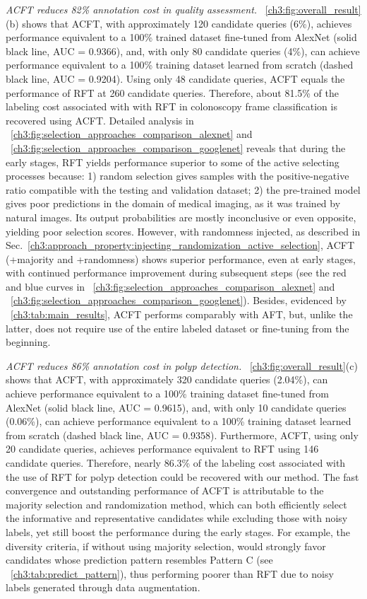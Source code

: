 \textit{ACFT reduces 82\% annotation cost in quality assessment.} \figurename~\ref{ch3:fig:overall_result}(b) shows that ACFT, with approximately 120 candidate queries (6\%), achieves performance equivalent to a 100\% trained dataset fine-tuned from AlexNet (solid black line, AUC = 0.9366), and, with only 80 candidate queries (4\%), can achieve performance equivalent to a 100\% training dataset learned from scratch (dashed black line, AUC = 0.9204). Using only 48 candidate queries, ACFT equals the performance of RFT at 260 candidate queries. Therefore, about 81.5\% of the labeling cost associated with with RFT in colonoscopy frame classification is recovered using ACFT. Detailed analysis in \figurename~\ref{ch3:fig:selection_approaches_comparison_alexnet} and \figurename~\ref{ch3:fig:selection_approaches_comparison_googlenet} reveals that during the early stages, RFT yields performance superior to some of the active selecting processes because: 
1) random selection gives samples with the positive-negative ratio compatible with the testing and validation dataset; 2) the pre-trained model gives poor predictions in the domain of medical imaging, as it was trained by natural images. Its output probabilities are mostly inconclusive or even opposite, yielding poor selection scores. However, with randomness injected, as described in Sec.~\ref{ch3:approach_property:injecting_randomization_active_selection}, ACFT (+majority and +randomness) shows superior performance, even at early stages, with continued performance improvement during subsequent steps (see the red and blue curves in \figurename~\ref{ch3:fig:selection_approaches_comparison_alexnet} and \figurename~\ref{ch3:fig:selection_approaches_comparison_googlenet}). Besides, evidenced by \tableautorefname~\ref{ch3:tab:main_results}, ACFT performs comparably with AFT, but, unlike the latter, does not require use of the entire labeled dataset or fine-tuning from the beginning. 

\textit{ACFT reduces 86\% annotation cost in polyp detection.} \figurename~\ref{ch3:fig:overall_result}(c) shows that ACFT, with approximately 320 candidate queries (2.04\%), can achieve performance equivalent to a 100\% training dataset fine-tuned from AlexNet (solid black line, AUC = 0.9615), and, with only 10 candidate queries (0.06\%), can achieve  performance equivalent to a 100\% training dataset learned from scratch (dashed black line, AUC = 0.9358). Furthermore, ACFT, using only 20 candidate queries, achieves performance equivalent to RFT using 146 candidate queries. Therefore, nearly 86.3\% of the labeling cost associated with the use of RFT for polyp detection could be recovered with our method. The fast convergence and outstanding performance of ACFT is attributable to the majority selection and randomization method, which can both efficiently select the informative and representative candidates while excluding those with noisy labels, yet still boost the performance during the early stages. For example, the diversity criteria, if without using majority selection, would strongly favor candidates whose prediction pattern resembles Pattern C (see \tableautorefname~\ref{ch3:tab:predict_pattern}), thus performing poorer than RFT due to noisy labels generated through data augmentation.

